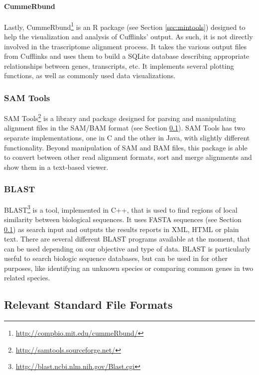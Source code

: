 \paragraph{CummeRbund}

Lastly, CummeRbund\footnote{\url{http://compbio.mit.edu/cummeRbund/}} is an R
package (see Section \ref{sec:mintools}) designed to help the visualization and
analysis of Cufflinks' \rnaseq{} output. As such, it is not directly involved in
the trascriptome alignment process. It takes the various output files from
Cufflinks and uses them to build a SQLite database describing appropriate
relationships between genes, transcripts, etc. It implements several plotting
functions, as well as commonly used data visualizations.

\subsubsection*{SAM Tools}

SAM Tools\footnote{\url{http://samtools.sourceforge.net/}} is a library and
package designed for parsing and manipulating alignment files in the SAM/BAM
format \cite{Li2009} (see Section \ref{sec:formats}). SAM Tools has two separate
implementations, one in C and the other in Java, with slightly different
functionality. Beyond manipulation of SAM and BAM files, this package is able to
convert between other read alignment formats, sort and merge alignments and show
them in a text-based viewer.

\subsubsection*{BLAST}

BLAST\footnote{\url{http://blast.ncbi.nlm.nih.gov/Blast.cgi}} is a tool,
implemented in C++, that is used to find regions of local similarity between
biological sequences. It uses FASTA sequences (see Section \ref{sec:formats}) as
search input and outputs the results reports in XML, HTML or plain text. There
are several different BLAST programs available at the moment, that can be used
depending on our objective and type of data. BLAST is particularly useful to
search biologic sequence databases, but can be used in for other purposes, like
identifying an unknown species or comparing common genes in two related species.

\subsection{Relevant Standard File Formats}\label{sec:formats}

